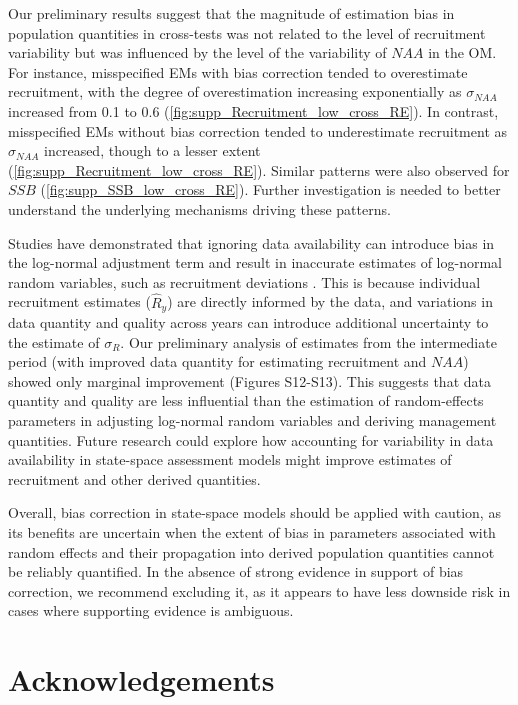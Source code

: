 \documentclass[
  12pt,
]{article}
\begin{document}
Our preliminary results suggest that the magnitude of estimation bias in
population quantities in cross-tests was not related to the level of
recruitment variability but was influenced by the level of the
variability of \(NAA\) in the OM. For instance, misspecified EMs with
bias correction tended to overestimate recruitment, with the degree of
overestimation increasing exponentially as \(\sigma_{NAA}\) increased
from 0.1 to 0.6 (\autoref{fig:supp_Recruitment_low_cross_RE}). In
contrast, misspecified EMs without bias correction tended to
underestimate recruitment as \(\sigma_{NAA}\) increased, though to a
lesser extent (\autoref{fig:supp_Recruitment_low_cross_RE}). Similar
patterns were also observed for \(SSB\)
(\autoref{fig:supp_SSB_low_cross_RE}). Further investigation is needed
to better understand the underlying mechanisms driving these patterns.

Studies have demonstrated that ignoring data availability can introduce
bias in the log-normal adjustment term and result in inaccurate
estimates of log-normal random variables, such as recruitment deviations
\citep{Methot2011, Thorson2016}. This is because individual recruitment
estimates (\(\hat{R}_{y}\)) are directly informed by the data, and
variations in data quantity and quality across years can introduce
additional uncertainty to the estimate of \(\sigma_{R}\). Our
preliminary analysis of estimates from the intermediate period (with
improved data quantity for estimating recruitment and \(NAA\)) showed
only marginal improvement (Figures S12-S13). This suggests that data
quantity and quality are less influential than the estimation of
random-effects parameters in adjusting log-normal random variables and
deriving management quantities. Future research could explore how
accounting for variability in data availability in state-space
assessment models might improve estimates of recruitment and other
derived quantities.

Overall, bias correction in state-space models should be applied with
caution, as its benefits are uncertain when the extent of bias in
parameters associated with random effects and their propagation into
derived population quantities cannot be reliably quantified. In the
absence of strong evidence in support of bias correction, we recommend
excluding it, as it appears to have less downside risk in cases where
supporting evidence is ambiguous.

\section{Acknowledgements}\label{acknowledgements}
\end{document}
